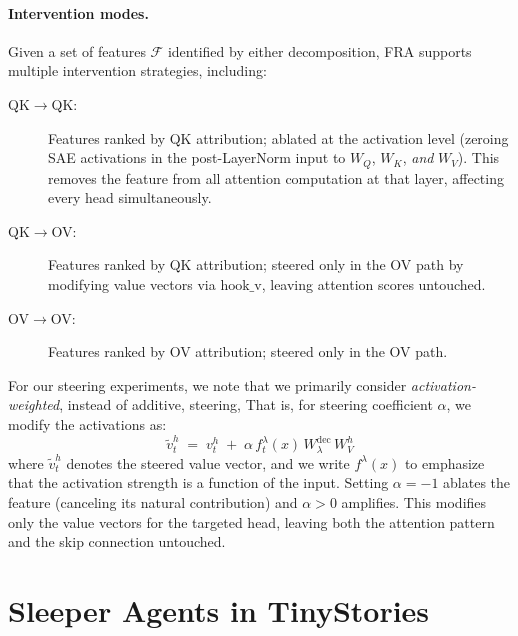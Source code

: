 \documentclass{article} %
\theoremstyle{plain}
\theoremstyle{definition}
\theoremstyle{remark}
\newcommand{\WQ}{W_Q}
\newcommand{\WK}{W_K}
\newcommand{\WV}{W_V}
\begin{document}
\paragraph{Intervention modes.} Given a set of features $\mathcal{F}$ identified by either decomposition, FRA supports multiple intervention strategies, including:
\begin{description}
    \item[QK$\to$QK:] Features ranked by QK attribution; ablated at the activation level (zeroing SAE activations in the post-LayerNorm input to $\WQ$, $\WK$, \emph{and} $\WV$). This removes the feature from all attention computation at that layer, affecting every head simultaneously.
    \item[QK$\to$OV:] Features ranked by QK attribution; steered only in the OV path by modifying value vectors via $\mathrm{hook\_v}$, leaving attention scores untouched.
    \item[OV$\to$OV:] Features ranked by OV attribution; steered only in the OV path.
\end{description}
For our steering experiments, we note that we primarily consider \textit{activation-weighted}, instead of additive, steering, That is, for steering coefficient $\alpha$, we modify the activations as:
\begin{equation}
    \tilde v^h_t \;=\; v^h_t \;+\; \alpha\, f_t^\lambda(x)\, W^{\mathrm{dec}}_\lambda\, \WV^h
    \label{eq:ov_steer}
\end{equation}
where $\tilde v^h_t$ denotes the steered value vector, and we write $f^\lambda(x)$ to emphasize that the activation strength is a function of the input. Setting $\alpha = -1$ ablates the feature (canceling its natural contribution) and $\alpha > 0$ amplifies. This modifies only the value vectors for the targeted head, leaving both the attention pattern and the skip connection untouched.



\section{Sleeper Agents in TinyStories}\label{sec:tinysleepers}
\end{document}
